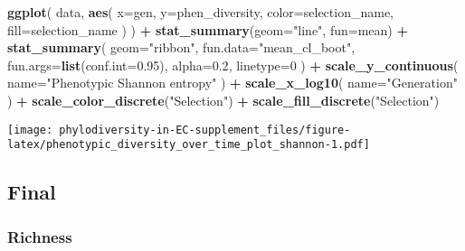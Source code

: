 \documentclass[]{book}
\newenvironment{Shaded}{\begin{snugshade}}{\end{snugshade}}
\newcommand{\DataTypeTok}[1]{\textcolor[rgb]{0.13,0.29,0.53}{#1}}
\newcommand{\DecValTok}[1]{\textcolor[rgb]{0.00,0.00,0.81}{#1}}
\newcommand{\FloatTok}[1]{\textcolor[rgb]{0.00,0.00,0.81}{#1}}
\newcommand{\KeywordTok}[1]{\textcolor[rgb]{0.13,0.29,0.53}{\textbf{#1}}}
\newcommand{\NormalTok}[1]{#1}
\newcommand{\OperatorTok}[1]{\textcolor[rgb]{0.81,0.36,0.00}{\textbf{#1}}}
\newcommand{\StringTok}[1]{\textcolor[rgb]{0.31,0.60,0.02}{#1}}
\begin{document}
\begin{Shaded}
\begin{Highlighting}[]
\KeywordTok{ggplot}\NormalTok{(}
\NormalTok{    data,}
    \KeywordTok{aes}\NormalTok{(}
      \DataTypeTok{x=}\NormalTok{gen,}
      \DataTypeTok{y=}\NormalTok{phen_diversity,}
      \DataTypeTok{color=}\NormalTok{selection_name,}
      \DataTypeTok{fill=}\NormalTok{selection_name}
\NormalTok{    )}
\NormalTok{  ) }\OperatorTok{+}
\StringTok{  }\KeywordTok{stat_summary}\NormalTok{(}\DataTypeTok{geom=}\StringTok{"line"}\NormalTok{, }\DataTypeTok{fun=}\NormalTok{mean) }\OperatorTok{+}
\StringTok{  }\KeywordTok{stat_summary}\NormalTok{(}
    \DataTypeTok{geom=}\StringTok{"ribbon"}\NormalTok{,}
    \DataTypeTok{fun.data=}\StringTok{"mean_cl_boot"}\NormalTok{,}
    \DataTypeTok{fun.args=}\KeywordTok{list}\NormalTok{(}\DataTypeTok{conf.int=}\FloatTok{0.95}\NormalTok{),}
    \DataTypeTok{alpha=}\FloatTok{0.2}\NormalTok{,}
    \DataTypeTok{linetype=}\DecValTok{0}
\NormalTok{  ) }\OperatorTok{+}
\StringTok{  }\KeywordTok{scale_y_continuous}\NormalTok{(}
    \DataTypeTok{name=}\StringTok{"Phenotypic Shannon entropy"}
\NormalTok{  ) }\OperatorTok{+}
\StringTok{  }\KeywordTok{scale_x_log10}\NormalTok{(}
    \DataTypeTok{name=}\StringTok{"Generation"}
\NormalTok{  ) }\OperatorTok{+}
\StringTok{  }\KeywordTok{scale_color_discrete}\NormalTok{(}\StringTok{"Selection"}\NormalTok{) }\OperatorTok{+}\StringTok{ }
\StringTok{  }\KeywordTok{scale_fill_discrete}\NormalTok{(}\StringTok{"Selection"}\NormalTok{)}
\end{Highlighting}
\end{Shaded}

\texttt{[image: phylodiversity-in-EC-supplement\_files/figure-latex/phenotypic\_diversity\_over\_time\_plot\_shannon-1.pdf]}

\hypertarget{final-2}{%
\subsection{Final}\label{final-2}}

\hypertarget{richness}{%
\subsubsection{Richness}\label{richness}}
\end{document}
